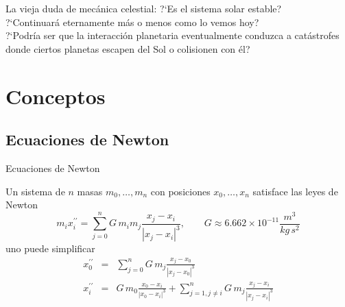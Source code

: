 \documentclass[8pt]{beamer}
\renewcommand{\>}{\rangle}
\newcommand{\<}{\langle}
\newcommand{\be}{\begin{equation}}
\newcommand{\ee}{\end{equation}}
\newcommand{\bea}{\begin{eqnarray}}
\newcommand{\eea}{\end{eqnarray}}
\begin{document}
\begin{frame}
{}
\vspace{-0.5cm}

\begin{mybox}{La vieja duda de mecánica celestial:}
?`Es el sistema solar estable?\\
?`Continuará eternamente más o menos como lo vemos hoy?\\
?`Podría ser que la interacción planetaria eventualmente conduzca a catástrofes donde 
ciertos planetas escapen del Sol o colisionen con él?
\end{mybox}
\pause

\begin{figure}[b]
\end{figure}

\vspace{0cm}
\end{frame}

\section[Conceptos]{Conceptos}

\subsection[Ecuaciones de Newton]{Ecuaciones de Newton}

\begin{frame}{Ecuaciones de Newton}

Un sistema de $n$ masas $m_{0}, \ldots , m_{n}$ con posiciones $x_{0}, \ldots , x_{n}$ 
satisface las leyes de Newton
\be
	m_{i} x_{i}^{\prime \prime} = \sum_{j=0}^{n}  G\, m_{i}m_{j} \frac{x_{j}-x_{i}}{|x_{j}-x_{i}|^{3}},
	\qquad G \approx 6.662 \times 10^{-11} \frac{m^{3}}{kg\, s^{2}} \nonumber
\ee
uno puede simplificar
\bea 
	x_{0}^{\prime \prime} &=& \sum_{j=0}^{n}  G\, m_{j} \frac{x_{j}-x_{0}}{|x_{j}-x_{0}|^{3}} \nonumber \\
	x_{i}^{\prime \prime} &=&  G\, m_{0} \frac{x_{0}-x_{i}}{|x_{0}-x_{i}|^{3}} + \sum_{j=1,j\neq i}^{n}  G\, m_{j} \frac{x_{j}-x_{i}}{|x_{j}-x_{i}|^{3}} \nonumber
\eea

\end{frame}
\end{document}
